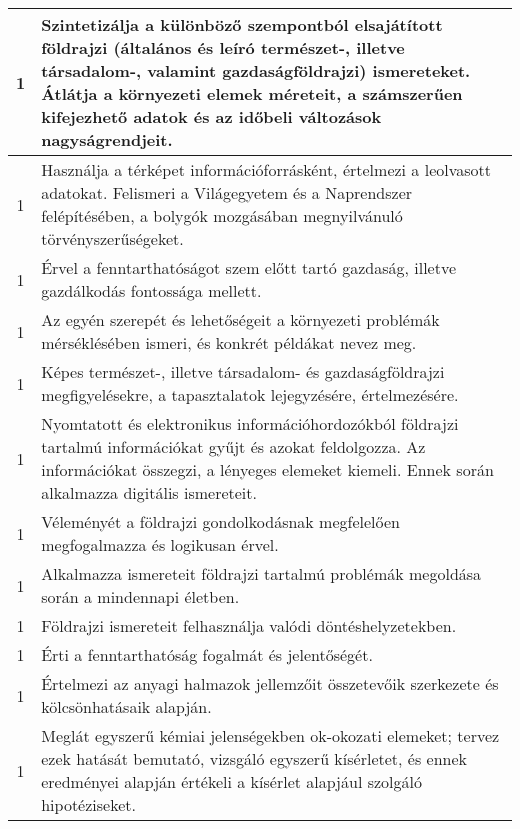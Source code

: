 \begin{longtable}{c | p{12cm} }
                                          1 &  Szintetizálja a különböző szempontból elsajátított földrajzi (általános és leíró természet-, illetve társadalom-, valamint gazdaságföldrajzi) ismereteket. Átlátja a környezeti elemek méreteit, a számszerűen kifejezhető adatok és az időbeli változások nagyságrendjeit. \\ \hline
                                          1 &  Használja a térképet információforrásként, értelmezi a leolvasott adatokat. Felismeri a Világegyetem és a Naprendszer felépítésében, a bolygók mozgásában megnyilvánuló törvényszerűségeket. \\ \hline
                                          1 &  Érvel a fenntarthatóságot szem előtt tartó gazdaság, illetve gazdálkodás fontossága mellett. \\ \hline
                                          1 &  Az egyén szerepét és lehetőségeit a környezeti problémák mérséklésében ismeri, és konkrét példákat nevez meg. \\ \hline
                                          1 &  Képes természet-, illetve társadalom- és gazdaságföldrajzi megfigyelésekre, a tapasztalatok lejegyzésére, értelmezésére. \\ \hline
                                          1 &  Nyomtatott és elektronikus információhordozókból földrajzi tartalmú információkat gyűjt és azokat feldolgozza. Az információkat összegzi, a lényeges elemeket kiemeli. Ennek során alkalmazza digitális ismereteit. \\ \hline
                                          1 &  Véleményét a földrajzi gondolkodásnak megfelelően megfogalmazza és logikusan érvel. \\ \hline
                                          1 &  Alkalmazza ismereteit földrajzi tartalmú problémák megoldása során a mindennapi életben. \\ \hline
                                          1 &  Földrajzi ismereteit felhasználja valódi döntéshelyzetekben. \\ \hline
                                          1 &  Érti a fenntarthatóság fogalmát és jelentőségét. \\ \hline
                                          1 &  Értelmezi az anyagi halmazok jellemzőit összetevőik szerkezete és kölcsönhatásaik alapján. \\ \hline
                                          1 &  Meglát egyszerű kémiai jelenségekben ok-okozati elemeket; tervez ezek hatását bemutató, vizsgáló egyszerű kísérletet, és ennek eredményei alapján értékeli a kísérlet alapjául szolgáló hipotéziseket. \\ \hline
                                      

\end{longtable}
